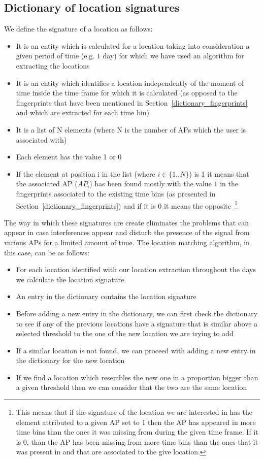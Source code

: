 \subsection{Dictionary of location signatures}
\label{dictionary_signatures}
We define the signature of a location as follows:
\begin{itemize}
  \item It is an entity which is calculated for a location taking into
  consideration a given period of time (e.g. $1$ day) for which we have used an
  algorithm for extracting the locations
  \item It is an entity which identifies a location independently of the moment
  of time inside the time frame for which it is calculated (as opposed to the
  fingerprints that have been mentioned in 
  Section~\ref{dictionary_fingerprints} and which are extracted for each time
  bin)
  \item It is a list of N elements (where N is the number of APs which the user
  is associated with)
  \item Each element has the value 1 or 0
  \item If the element at position i in the list (where $i \in \{1..N\}$) is 1
  it means that the associated AP ($AP_{i}$) has been found mostly with the
  value $1$ in the fingerprints associated to the existing time bins (as
  presented in Section~\ref{dictionary_fingerprints}) and if it is 0
  it means the opposite~\footnote{This means that if the signature of the
  location we are interested in has the element attributed to a given AP set to
  1 then the AP has appeared in more time bins than the ones it was missing
  from during the given time frame. If it is 0, than the AP has been missing
  from more time bins than the ones that it was present in and that are
  associated to the give location.}
\end{itemize}

The way in which these signatures are create eliminates the problems that can
appear in case interferences appear and disturb the presence of the signal from
various APs for a limited amount of time. The location matching algorithm, in
this case, can be as follows:

\begin{itemize}
  \item For each location identified with our location extraction throughout the
  days we calculate the location signature
  \item An entry in the dictionary contains the location signature
  \item Before adding a new entry in the dictionary, we can first
  check the dictionary to see if any of the previous locations have a signature
  that is similar above a selected threshold to the one of the new location we
  are trying to add
  \item If a similar location is not found, we can proceed with adding a new
  entry in the dictionary for the new location
  \item If we find a location which resembles the new one in a proportion bigger
  than a given threshold then we can consider that the two are the same
  location
\end{itemize}

